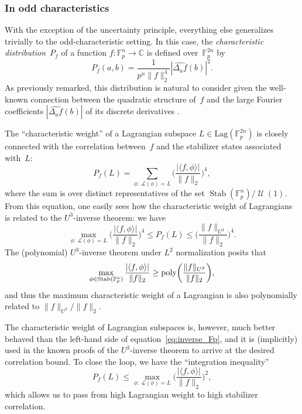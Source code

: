 \documentclass[11pt]{amsart}
\newcommand{\Lag}{\mathrm{Lag}}
\DeclareMathOperator{\Stab}{Stab}\DeclareMathOperator{\Spec}{Spec}
\newcommand{\C}{\mathbb{C}} %
\newcommand{\F}{\mathbb{F}} %
\newcommand{\Lcal}{\mathcal{L}}
\DeclareMathOperator{\U}{\mathcal{U}}
\newcommand{\poly}{\mbox{\rm poly}}
\theoremstyle{plain}
\theoremstyle{definition}
\theoremstyle{remark}
\begin{document}
\subsubsection{In odd characteristics}
With the exception of the uncertainty principle, everything else generalizes trivially to the odd-characteristic setting.
In this case, the \emph{characteristic distribution}~$P_f$ of a function $f: \F_p^n \to \C$ is defined over~$\F_p^{2n}$ by
$$P_f(a,b) = \frac{1}{p^n \|f\|_2^4} |\widehat{\Delta_af}(b)|^2.$$
As previously remarked, this distribution is natural to consider given the well-known connection between the quadratic structure of~$f$ and the large Fourier coefficients $|\widehat{\Delta_af}(b)|$ of its discrete derivatives \cite{Gowers1998}.

The ``characteristic weight'' of a Lagrangian subspace $L\in \Lag(\F_p^{2n})$ is closely connected with the correlation between~$f$ and the stabilizer states associated with~$L$:
$$P_f(L) = \sum_{\phi:\: \Lcal(\phi)=L} \bigg(\frac{|\langle f, \phi\rangle|}{\|f\|_2}\bigg)^4,$$
where the sum is over distinct representatives of the set $\Stab(\F_p^n)/\U(1)$.
From this equation, one easily sees how the characteristic weight of Lagrangians is related to the $U^3$-inverse theorem:
we have
\begin{equation*}
    \max_{\phi:\: \Lcal(\phi)=L} \bigg(\frac{|\langle f, \phi\rangle|}{\|f\|_2}\bigg)^4
    \leq
    P_f(L)
    \leq 
    \bigg(\frac{\|f\|_{U^3}}{\|f\|_2}\bigg)^4.
\end{equation*}
The (polynomial) $U^3$-inverse theorem under $L^2$ normalization posits that
\begin{equation} \label{eq:inverse_Fp}
    \max_{\phi \in \Stab(\F_p^n)} \frac{|\langle f, \phi\rangle|}{\|f\|_2} \geq \poly\bigg(\frac{\|f\|_{U^3}}{\|f\|_2} \bigg),
\end{equation}
and thus the maximum characteristic weight of a Lagrangian is also polynomially related to $\|f\|_{U^3}/\|f\|_2$.

The characteristic weight of Lagrangian subspaces is, however, much better behaved than the left-hand side of equation~\eqref{eq:inverse_Fp}, and it is (implicitly) used in the known proofs of the $U^3$-inverse theorem to arrive at the desired correlation bound.
To close the loop, we have the ``integration inequality''
\begin{equation} \label{eq:integration}
    P_f(L) \leq \max_{\phi:\: \Lcal(\phi)=L} \bigg(\frac{|\langle f, \phi\rangle|}{\|f\|_2}\bigg)^2,
\end{equation}
which allows us to pass from high Lagrangian weight to high stabilizer correlation.
\end{document}
